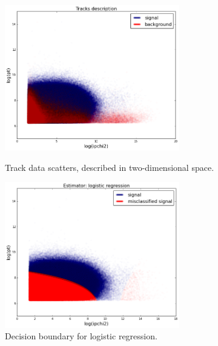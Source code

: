 \documentclass[a4paper]{jpconf}
\begin{document}
\begin{figure}[h]
\begin{minipage}{18pc}
\includegraphics[width=18pc]{../images/track-db}
\caption{\label{hlt1} Track data scatters, described in two-dimensional space.}
\end{minipage}\hspace{2pc}%
\begin{minipage}{18pc}
\includegraphics[width=18pc]{../images/log-track-db}
\caption{\label{hlt1log} Decision boundary for logistic regression.}
\end{minipage} 

\end{figure}
\end{document}
